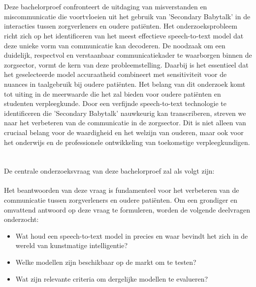 \section{}%
\label{sec:probleemstelling}
Deze bachelorproef confronteert de uitdaging van misverstanden en miscommunicatie die voortvloeien uit het gebruik van 'Secondary Babytalk' in de interacties tussen zorgverleners en oudere patiënten. Het onderzoeksprobleem richt zich op het identificeren van het meest effectieve speech-to-text model dat deze unieke vorm van communicatie kan decoderen. De noodzaak om een duidelijk, respectvol en verstaanbaar communicatiekader te waarborgen binnen de zorgsector, vormt de kern van deze probleemstelling. Daarbij is het essentieel dat het geselecteerde model accuraatheid combineert met sensitiviteit voor de nuances in taalgebruik bij oudere patiënten.
Het belang van dit onderzoek komt tot uiting in de meerwaarde die het zal bieden voor oudere patiënten en studenten verpleegkunde. Door een verfijnde speech-to-text technologie te identificeren die 'Secondary Babytalk' nauwkeurig kan transcriberen, streven we naar het verbeteren van de communicatie in de zorgsector. Dit is niet alleen van cruciaal belang voor de waardigheid en het welzijn van ouderen, maar ook voor het onderwijs en de professionele ontwikkeling van toekomstige verpleegkundigen.



\section{}%
\label{sec:onderzoeksvraag}

De centrale onderzoeksvraag van deze bachelorproef zal als volgt zijn:\\


\\
\break
Het beantwoorden van deze vraag is fundamenteel voor het verbeteren van de communicatie tussen zorgverleners en oudere patiënten. Om een grondiger en omvattend antwoord op deze vraag te formuleren, worden de volgende deelvragen onderzocht:

\begin{itemize}
    \item Wat houd een speech-to-text model in precies en waar bevindt het zich in de wereld van kunstmatige intelligentie?
    \item Welke modellen zijn beschikbaar op de markt om te testen?
    \item Wat zijn relevante criteria om dergelijke modellen te evalueren?
\end{itemize}
